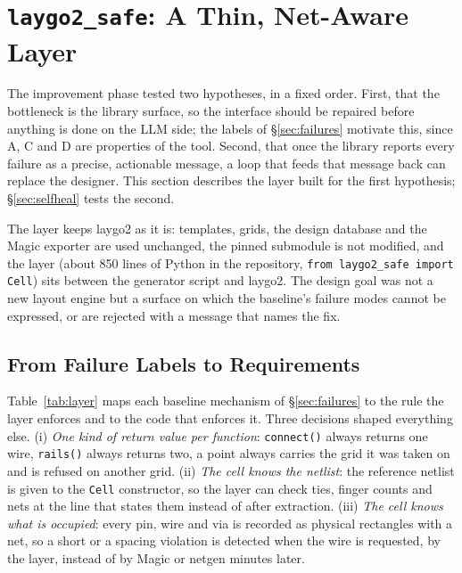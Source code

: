 \documentclass[conference]{IEEEtran}
\newcommand{\code}[1]{\texttt{#1}}
\begin{document}
\section{\code{laygo2\_safe}: A Thin, Net-Aware Layer}
\label{sec:layer}
The improvement phase tested two hypotheses, in a fixed order. First, that the bottleneck is the library surface, so the interface should be repaired before anything is done on the LLM side; the labels of \S\ref{sec:failures} motivate this, since A, C and D are properties of the tool. Second, that once the library reports every failure as a precise, actionable message, a loop that feeds that message back can replace the designer. This section describes the layer built for the first hypothesis; \S\ref{sec:selfheal} tests the second.

The layer keeps laygo2 as it is: templates, grids, the design database and the Magic exporter are used unchanged, the pinned submodule is not modified, and the layer (about 850 lines of Python in the repository, \code{from laygo2\_safe import Cell}) sits between the generator script and laygo2. The design goal was not a new layout engine but a surface on which the baseline's failure modes cannot be expressed, or are rejected with a message that names the fix.

\subsection{From Failure Labels to Requirements}
Table~\ref{tab:layer} maps each baseline mechanism of \S\ref{sec:failures} to the rule the layer enforces and to the code that enforces it. Three decisions shaped everything else. (i) \emph{One kind of return value per function}: \code{connect()} always returns one wire, \code{rails()} always returns two, a point always carries the grid it was taken on and is refused on another grid. (ii) \emph{The cell knows the netlist}: the reference netlist is given to the \code{Cell} constructor, so the layer can check ties, finger counts and nets at the line that states them instead of after extraction. (iii) \emph{The cell knows what is occupied}: every pin, wire and via is recorded as physical rectangles with a net, so a short or a spacing violation is detected when the wire is requested, by the layer, instead of by Magic or netgen minutes later.
\end{document}
